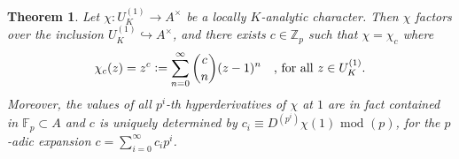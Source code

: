 \documentclass[a4paper, reqno, 10pt]{amsart}
\newtheorem{theorem}{Theorem}[subsection]
\theoremstyle{definition}
\numberwithin{equation}{section}
\newcommand{\defeq}{\vcentcolon=}
\renewcommand{\mod}{{\,\,\mathrm{mod}\,\,}}
\newcommand{\ra}{\rightarrow}
\newcommand{\unts}{^{\times}}
\newcommand{\BF}{{\mathbb {F}}}
\newcommand{\BZ}{{\mathbb {Z}}}
\begin{document}
\begin{theorem}\label{Thm A2 - Locally analytic characters in equal characteristic}
	Let $\chi \colon U_K^{(1)} \ra A\unts$ be a locally $K$-analytic character.
	Then $\chi$ factors over the inclusion $U_K^{(1)} \hookrightarrow A\unts$, and there exists $c\in \BZ_p$ such that $\chi = \chi_c$ where
	\begin{equation}\label{Eq A2 - Form of multiplicative locally analytic characters}
		\chi_c (z) = z^c \defeq \sum_{n=0}^\infty \binom{c}{n} (z-1)^n \quad\text{, for all $z\in U_K^{(1)}$.}
	\end{equation}
	Moreover, the values of all $p^i$-th hyperderivatives of $\chi$ at $1$ are in fact contained in $\BF_p \subset A$ and $c$ is uniquely determined by $c_i \equiv D^{(p^i)} \chi(1) \mod (p)$, for the $p$-adic expansion $c=\sum_{i= 0}^\infty c_i p^i$.
\end{theorem}
\end{document}
